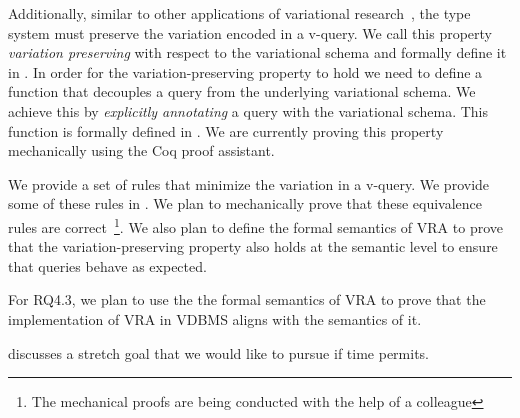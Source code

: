 Additionally, 
similar to other applications of variational research~\cite{CEW16ecoop,CEW14toplas},
the type system must preserve the variation encoded in a v-query.
We call this property \emph{variation preserving} with respect to the
variational schema and formally define it in .
%
In order for the variation-preserving property to hold we need to define 
a function that decouples a query from the underlying variational schema.
We achieve this by \emph{explicitly annotating} a query with the variational
schema. This function is formally defined in .
We are currently proving this property mechanically using the Coq
proof assistant.
%

We provide a set of rules that minimize
the variation in a v-query. We provide some of these rules in .
We plan to mechanically prove that these equivalence rules
are correct~\footnote{The mechanical proofs are being conducted with the help of a colleague}. 
%
We also plan to define the formal semantics of VRA to prove
that the variation-preserving property also holds at the semantic 
level to ensure that queries behave as expected.




For RQ4.3, we plan to use the the formal semantics of VRA 
to
prove that the implementation of VRA in VDBMS aligns with
the semantics of it. 

 discusses a stretch goal that we would like to pursue if time permits.







